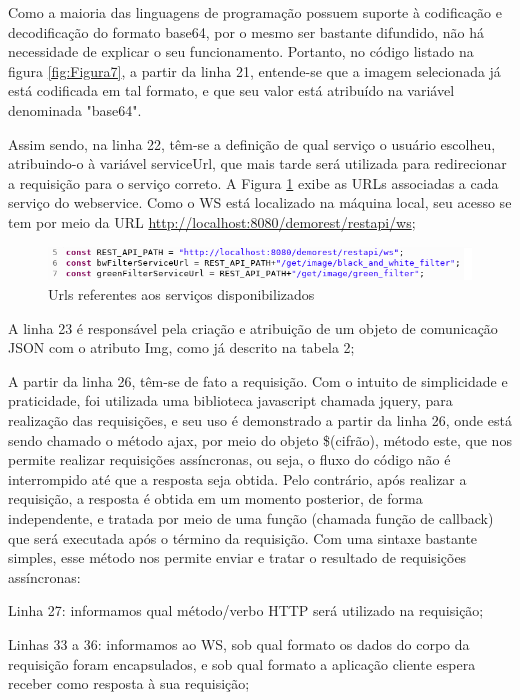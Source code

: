 \documentclass[12pt]{article}
\begin{document}
Como a maioria das linguagens de programação possuem suporte à codificação e decodificação do formato base64, por o mesmo ser bastante difundido, não há necessidade de explicar o seu funcionamento. Portanto, no código listado na figura \ref{fig:Figura7}, a partir da linha 21, entende-se que a imagem selecionada já está codificada em tal formato, e que seu valor está atribuído na variável denominada "base64". 

Assim sendo, na linha 22, têm-se a definição de qual serviço o usuário escolheu, atribuindo-o à variável serviceUrl, que mais tarde será utilizada para redirecionar a requisição para o serviço correto. A Figura \ref{fig:Figura8} exibe as URLs associadas a cada serviço do webservice. Como o WS está localizado na máquina local, seu acesso se tem por meio da URL \url{http://localhost:8080/demorest/restapi/ws}; 

\begin{figure}[ht]
	\centering
	\includegraphics[width=.9\textwidth]{caminho-servicos.png}
	\caption{Urls referentes aos serviços disponibilizados}
	\label{fig:Figura8}
\end{figure}

A linha 23 é responsável pela criação e atribuição de um objeto de comunicação JSON com o atributo Img, como já descrito na tabela 2; 

A partir da linha 26, têm-se de fato a requisição. Com o intuito de simplicidade e praticidade, foi utilizada uma biblioteca javascript chamada jquery, para realização das requisições, e seu uso é demonstrado a partir da linha 26, onde está sendo chamado o método ajax, por meio do objeto \$(cifrão), método este, que nos permite realizar requisições assíncronas, ou seja, o fluxo do código não é interrompido até que a resposta seja obtida. Pelo contrário, após realizar a requisição, a resposta é obtida em um momento posterior, de forma independente, e tratada por meio de uma função (chamada função de callback) que será executada após o término da requisição. Com uma sintaxe bastante simples, esse método nos permite enviar e tratar o resultado de requisições assíncronas:

Linha 27: informamos qual método/verbo HTTP será utilizado na requisição;

Linhas 33 a 36: informamos ao WS, sob qual formato os dados do corpo da requisição foram encapsulados, e sob qual formato a aplicação cliente espera receber como resposta à sua requisição;
\end{document}
